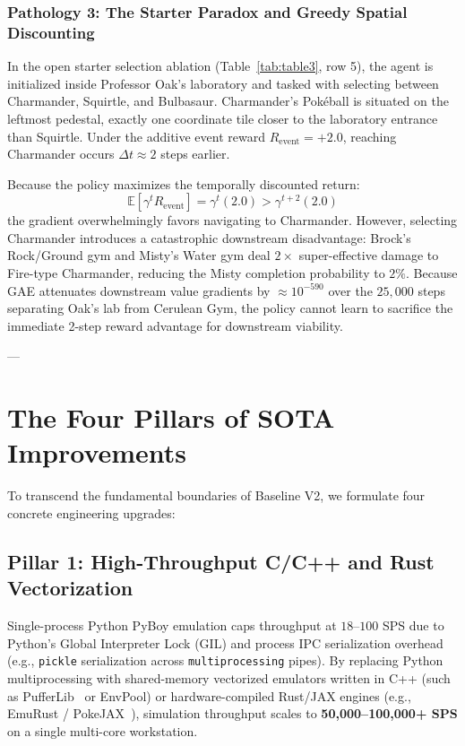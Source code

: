 \documentclass[conference]{IEEEtran}
\begin{document}
\subsubsection{Pathology 3: The Starter Paradox and Greedy Spatial Discounting}
In the open starter selection ablation (Table~\ref{tab:table3}, row 5), the agent is initialized inside Professor Oak's laboratory and tasked with selecting between Charmander, Squirtle, and Bulbasaur. Charmander's Pokéball is situated on the leftmost pedestal, exactly one coordinate tile closer to the laboratory entrance than Squirtle. Under the additive event reward $R_{\text{event}} = +2.0$, reaching Charmander occurs $\Delta t \approx 2$ steps earlier.

Because the policy maximizes the temporally discounted return:
\begin{equation}
\mathbb{E}\left[ \gamma^{t} R_{\text{event}} \right] = \gamma^{t} (2.0) > \gamma^{t+2} (2.0)
\end{equation}
the gradient overwhelmingly favors navigating to Charmander. However, selecting Charmander introduces a catastrophic downstream disadvantage: Brock's Rock/Ground gym and Misty's Water gym deal $2\times$ super-effective damage to Fire-type Charmander, reducing the Misty completion probability to $2\%$. Because GAE attenuates downstream value gradients by $\approx 10^{-590}$ over the $25{,}000$ steps separating Oak's lab from Cerulean Gym, the policy cannot learn to sacrifice the immediate 2-step reward advantage for downstream viability.

---

\section{The Four Pillars of SOTA Improvements}

To transcend the fundamental boundaries of Baseline V2, we formulate four concrete engineering upgrades:

\subsection{Pillar 1: High-Throughput C/C++ and Rust Vectorization}
Single-process Python PyBoy emulation caps throughput at $18$--$100$ SPS due to Python's Global Interpreter Lock (GIL) and process IPC serialization overhead (e.g., \texttt{pickle} serialization across \texttt{multiprocessing} pipes). By replacing Python multiprocessing with shared-memory vectorized emulators written in C++ (such as PufferLib~\cite{suarez2023pufferlib} or EnvPool) or hardware-compiled Rust/JAX engines (e.g., EmuRust / PokeJAX~\cite{karten2026automatic}), simulation throughput scales to \textbf{50,000--100,000+ SPS} on a single multi-core workstation.
\end{document}
